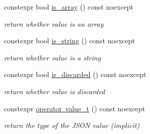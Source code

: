 \begin{DoxyCompactItemize}
constexpr bool \mbox{\hyperlink{classnlohmann_1_1basic__json_aef9ce5dd2381caee1f8ddcdb5bdd9c65}{is\+\_\+array}} () const noexcept
\begin{DoxyCompactList}\small\item\em return whether value is an array \end{DoxyCompactList}\item 
constexpr bool \mbox{\hyperlink{classnlohmann_1_1basic__json_a69b596a4a6683b362095c9a139637396}{is\+\_\+string}} () const noexcept
\begin{DoxyCompactList}\small\item\em return whether value is a string \end{DoxyCompactList}\item 
constexpr bool \mbox{\hyperlink{classnlohmann_1_1basic__json_aabe623bc8304c2ba92d96d91f390fab4}{is\+\_\+discarded}} () const noexcept
\begin{DoxyCompactList}\small\item\em return whether value is discarded \end{DoxyCompactList}\item 
constexpr \mbox{\hyperlink{classnlohmann_1_1basic__json_a26ef3058e249f82a04f8ec18f7419027}{operator value\+\_\+t}} () const noexcept
\begin{DoxyCompactList}\small\item\em return the type of the J\+S\+ON value (implicit) \end{DoxyCompactList}\end{DoxyCompactItemize}
